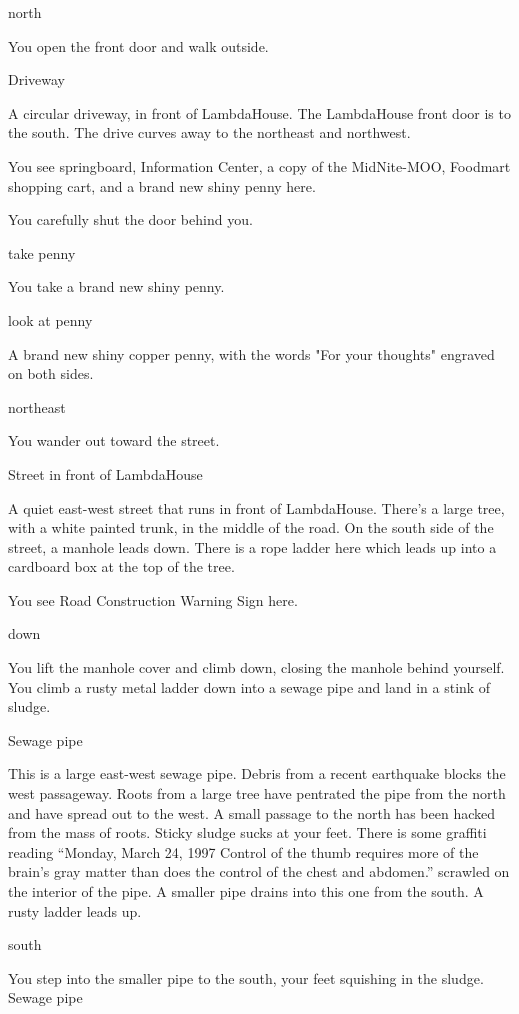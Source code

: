 \documentclass[10pt,twoside,openany]{memoir}
\begin{document}
{north

You open the front door and walk outside.

Driveway

A circular driveway, in front of LambdaHouse. The LambdaHouse front door is to
 the south. The drive curves away to the northeast and northwest.

You see springboard, Information Center, a copy of the MidNite-MOO, Foodmart shopping cart, and a brand new shiny penny here.

You carefully shut the door behind you.

take penny

You take a brand new shiny penny.

look at penny

A brand new shiny copper penny, with the words "For your thoughts" engraved on
 both sides.

northeast

You wander out toward the street.

Street in front of LambdaHouse

A quiet east-west street that runs in front of LambdaHouse. There's a large
 tree, with a white painted trunk, in the middle of the road.  On the south
 side of the street, a manhole leads down. There is a rope ladder here which
 leads up into a cardboard box at the top of the tree.

You see Road Construction Warning Sign here.

down

You lift the manhole cover and climb down, closing the manhole behind
 yourself.  You climb a rusty metal ladder down into a sewage pipe and land in
 a stink of sludge.

Sewage pipe

This is a large east-west sewage pipe.  Debris from a recent earthquake blocks
 the west passageway.  Roots from a large tree have pentrated the pipe from
 the north and have spread out to the west.  A small passage to the north has
 been hacked from the mass of roots.  Sticky sludge sucks at your feet.  There
 is some graffiti reading ``Monday, March 24, 1997  Control of the thumb
 requires more of the brain's gray matter than does the control of the chest
 and abdomen.'' scrawled on the interior of the pipe.  A smaller pipe drains
 into this one from the south.  A rusty ladder leads up.

south

You step into the smaller pipe to the south, your feet squishing in the sludge.
Sewage pipe

}
\end{document}
